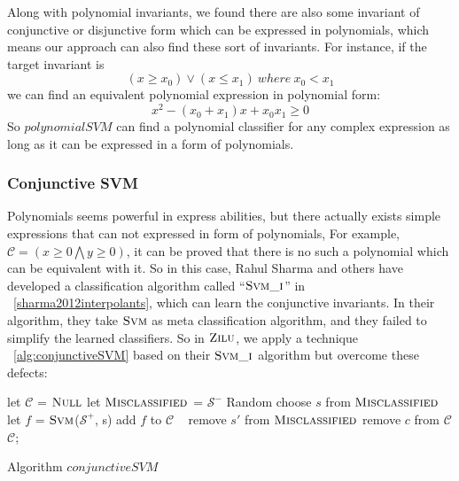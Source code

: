 Along with polynomial invariants, we found there are also some invariant of conjunctive or disjunctive form which can be expressed in polynomials,
which means our approach can also find these sort of invariants.
For instance, if the target invariant is 
$$(x \ge x_0) \vee (x \le x_1) \ where\ x_0 < x_1$$
we can find an equivalent polynomial expression in polynomial form:
$$x^2 - (x_0 + x_1)x + x_0x_1 \ge 0$$ 
So $polynomialSVM$ can find a polynomial classifier for any complex expression as long as it can be expressed in a form of polynomials.


\subsubsection{Conjunctive SVM}
Polynomials seems powerful in express abilities, 
but there actually exists simple expressions that can not expressed in form of polynomials,
For example, $\mathcal{C} = (x \ge 0 \bigwedge y \ge 0)$,
it can be proved that there is no such a polynomial which can be equivalent with it.
So in this case, Rahul Sharma and others have developed a classification algorithm called ``$\textsc{Svm\_i}$'' in ~\ref{sharma2012interpolants},
which can learn the conjunctive invariants.
In their algorithm, they take $\textsc{Svm}$ as meta classification algorithm, and they failed to simplify the learned classifiers.
So in $\textsc{Zilu}$, we apply a technique ~\ref{alg:conjunctiveSVM} based on their $\textsc{Svm\_i}$ algorithm but overcome these defects:

\begin{algorithm}[!h]
\SetAlgoVlined
\Indm
{}
\Indp
    let $\mathcal{C}$ = $\textsc{Null}$\;
    let $\textsc{Misclassified}$ = $\mathcal{S}^-$\;
     {
        Random choose $s$ from $\textsc{Misclassified}$\;
        let $f$ = $\textsc{Svm}$($\mathcal{S}^+$, s)\;
        add $f$ to $\mathcal{C}$\;
         {\
             {
                remove $s'$ from $\textsc{Misclassified}$\;
            }
        }
    }
     {
         {
            remove $c$ from $\mathcal{C}$\;
        }
    }
    \Return $\mathcal{C}$;
\caption{Algorithm $conjunctiveSVM$}
\label{alg:conjunctiveSVM}
\end{algorithm}



